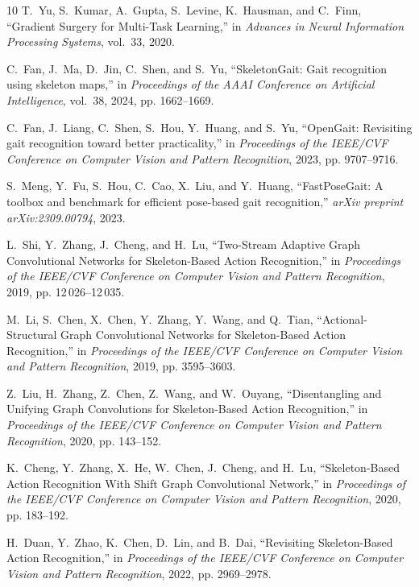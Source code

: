 \documentclass[journal]{IEEEtran}
\begin{document}
\begin{thebibliography}{10}
T.~Yu, S.~Kumar, A.~Gupta, S.~Levine, K.~Hausman, and C.~Finn, ``{Gradient
  Surgery for Multi-Task Learning},'' in \emph{{Advances in Neural Information
  Processing Systems}}, vol.~33, 2020.

C.~Fan, J.~Ma, D.~Jin, C.~Shen, and S.~Yu, ``{SkeletonGait}: Gait recognition
  using skeleton maps,'' in \emph{{Proceedings of the AAAI Conference on
  Artificial Intelligence}}, vol.~38, 2024, pp. 1662--1669.

C.~Fan, J.~Liang, C.~Shen, S.~Hou, Y.~Huang, and S.~Yu, ``{OpenGait}:
  Revisiting gait recognition toward better practicality,'' in
  \emph{{Proceedings of the IEEE/CVF Conference on Computer Vision and Pattern
  Recognition}}, 2023, pp. 9707--9716.

S.~Meng, Y.~Fu, S.~Hou, C.~Cao, X.~Liu, and Y.~Huang, ``{FastPoseGait}: A
  toolbox and benchmark for efficient pose-based gait recognition,''
  \emph{arXiv preprint arXiv:2309.00794}, 2023.

L.~Shi, Y.~Zhang, J.~Cheng, and H.~Lu, ``{Two-Stream Adaptive Graph
  Convolutional Networks for Skeleton-Based Action Recognition},'' in
  \emph{{Proceedings of the IEEE/CVF Conference on Computer Vision and Pattern
  Recognition}}, 2019, pp. 12\,026--12\,035.

M.~Li, S.~Chen, X.~Chen, Y.~Zhang, Y.~Wang, and Q.~Tian, ``{Actional-Structural
  Graph Convolutional Networks for Skeleton-Based Action Recognition},'' in
  \emph{{Proceedings of the IEEE/CVF Conference on Computer Vision and Pattern
  Recognition}}, 2019, pp. 3595--3603.

Z.~Liu, H.~Zhang, Z.~Chen, Z.~Wang, and W.~Ouyang, ``{Disentangling and
  Unifying Graph Convolutions for Skeleton-Based Action Recognition},'' in
  \emph{{Proceedings of the IEEE/CVF Conference on Computer Vision and Pattern
  Recognition}}, 2020, pp. 143--152.

K.~Cheng, Y.~Zhang, X.~He, W.~Chen, J.~Cheng, and H.~Lu, ``{Skeleton-Based
  Action Recognition With Shift Graph Convolutional Network},'' in
  \emph{{Proceedings of the IEEE/CVF Conference on Computer Vision and Pattern
  Recognition}}, 2020, pp. 183--192.

H.~Duan, Y.~Zhao, K.~Chen, D.~Lin, and B.~Dai, ``{Revisiting Skeleton-Based
  Action Recognition},'' in \emph{{Proceedings of the IEEE/CVF Conference on
  Computer Vision and Pattern Recognition}}, 2022, pp. 2969--2978.


\end{thebibliography}
\end{document}
